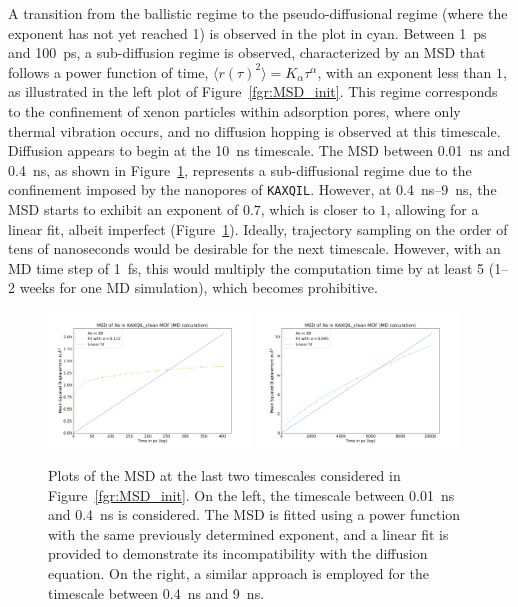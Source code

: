 \documentclass[main]{subfiles}
\begin{document}
A transition from the ballistic regime to the pseudo-diffusional regime (where the exponent has not yet reached 1) is observed in the plot in cyan. Between \SI{1}{\ps} and \SI{100}{\ps}, a sub-diffusion regime is observed, characterized by an MSD that follows a power function of time, $\langle {r(\tau)}^2 \rangle=K_\alpha\tau^\alpha$, with an exponent less than $1$, as illustrated in the left plot of Figure~\ref{fgr:MSD_init}. This regime corresponds to the confinement of xenon particles within adsorption pores, where only thermal vibration occurs, and no diffusion hopping is observed at this timescale. Diffusion appears to begin at the \SI{10}{\ns} timescale. The MSD between \SI{0.01}{\ns} and \SI{0.4}{\ns}, as shown in Figure~\ref{fgr:MSD_linear_init}, represents a sub-diffusional regime due to the confinement imposed by the nanopores of \texttt{KAXQIL}. However, at \SI{0.4}{\ns}--\SI{9}{\ns}, the MSD starts to exhibit an exponent of $0.7$, which is closer to $1$, allowing for a linear fit, albeit imperfect (Figure~\ref{fgr:MSD_linear_init}). Ideally, trajectory sampling on the order of tens of nanoseconds would be desirable for the next timescale. However, with an MD time step of \SI{1}{\fs}, this would multiply the computation time by at least 5 (1--2 weeks for one MD simulation), which becomes prohibitive.

\begin{figure}[ht]
  \centering
\includegraphics[width=0.48\textwidth]{figures/5-diffusion/MSD_Xe_coeff_KAXQIL_clean_1.pdf}
\includegraphics[width=0.48\textwidth]{figures/5-diffusion/MSD_Xe_coeff_KAXQIL_clean_2.pdf}
\caption{ Plots of the MSD at the last two timescales considered in Figure~\ref{fgr:MSD_init}. On the left, the timescale between \SI{0.01}{\ns} and \SI{0.4}{\ns} is considered. The MSD is fitted using a power function with the same previously determined exponent, and a linear fit is provided to demonstrate its incompatibility with the diffusion equation. On the right, a similar approach is employed for the timescale between \SI{0.4}{\ns} and \SI{9}{\ns}. }\label{fgr:MSD_linear_init}
\end{figure}
\end{document}
